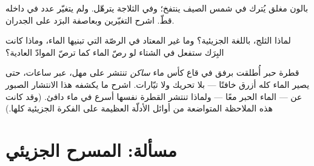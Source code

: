\begin{exercise}[$\star\star$]\label{exo:g7:states-of-matter:10}
بالون مغلق يُترك في شمس الصيف ينتفخ؛ وفي الثلاجة يترهّل. ولم
يتغيّر عدد  في داخله قطّ. اشرح التغيّرين 
 وبعاصفة البرَد على الجدران.
\end{exercise}

\begin{exercise}[$\star\star$]\label{exo:g7:states-of-matter:11}
لماذا  الثلج، باللغة الجزيئية؟ وما غير المعتاد في الرصّة
التي تبنيها  الماء، وماذا كانت البِرَك ستفعل في الشتاء لو
رصّ الماء كما ترصّ الموادّ العادية؟
\end{exercise}

\begin{exercise}[$\star\star\star$]\label{exo:g7:states-of-matter:12}
قطرة حبر أُطلقت برفق في قاع كأس ماء \emph{ساكن} تنتشر على مهل،
عبر ساعات، حتى يصير الماء كله أزرق خافتًا --- بلا تحريك ولا
تيّارات. اشرح ما يكشفه هذا الانتشار الصبور عن   ---
 الماء  الحبر معًا --- ولماذا تنتشر القطرة نفسها
أسرع في ماء دافئ. (وقد كانت هذه الملاحظة المتواضعة من أوائل
الأدلّة العظيمة على الفكرة الجزيئية كلها.)
\end{exercise}

\section{مسألة: المسرح الجزيئي}

